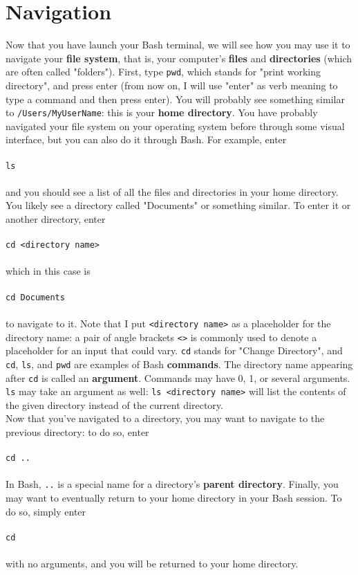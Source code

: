 \documentclass{article}
\begin{document}
\section*{Navigation}
Now that you have launch your Bash terminal, we will see how you may use it to navigate your \textbf{file system}, that
is, your computer's \textbf{files} and \textbf{directories} (which are often called "folders").
First, type \verb|pwd|, which stands for "print working directory", and press
enter (from now on, I will use "enter" as verb meaning to type a command and then press enter). You will probably
see something similar to \verb|/Users/MyUserName|: this is your \textbf{home directory}. You have probably navigated
your file system on your operating system before through some visual interface, but you
can also do it through Bash. For example, enter \\ \\
\verb|ls| \\ \\
and you should see a list of all the files and 
directories in your home directory. You likely see a directory called "Documents" or something similar. To enter
it or another directory, enter \\\\
\verb|cd <directory name>| \\\\ which in this case is \\\\\verb|cd Documents|\\\\ to navigate to it.
Note that I put \verb|<directory name>| as a placeholder for the directory name: a pair of angle brackets \verb|<>| is
commonly used to denote a placeholder for an input that could vary. \verb|cd| stands for "Change Directory", and 
\verb|cd|, \verb|ls|, and \verb|pwd| are examples of Bash \textbf{commands}. The directory name appearing after 
\verb|cd| is called an \textbf{argument}. Commands may have 0, 1, or several arguments. \verb|ls| may take an argument
as well: \verb|ls <directory name>| will list the contents of the given directory instead of the current directory. \\

Now that you've navigated to a directory, you may want to navigate to the previous directory: to do so, enter 
\\\\\verb|cd ..|\\\\ In Bash, \verb|..| is a special name for a directory's \textbf{parent directory}. Finally, you may 
want to eventually return to your home directory in your Bash session. To do so, simply enter \\\\\verb|cd|\\\\ with no 
arguments, and you will be returned to your home directory.
\end{document}
